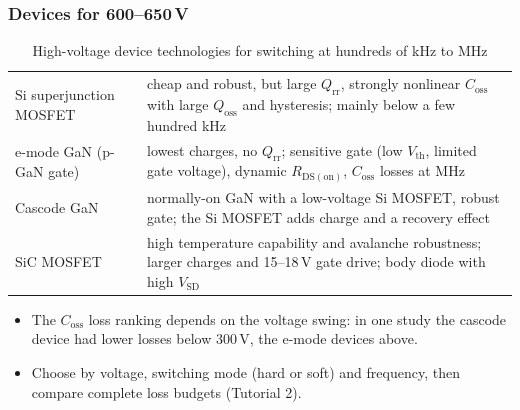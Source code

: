 \begin{frame}
	\frametitle{Devices for 600--650\,V}
	\begin{table}
		\centering
		\small
		\begin{tabular}{|l|>{\raggedright\arraybackslash}p{9.6cm}|}
			\hline
			Si superjunction MOSFET & cheap and robust, but large $Q_\mathrm{rr}$, strongly nonlinear $C_\mathrm{oss}$ with large $Q_\mathrm{oss}$ and hysteresis; mainly below a few hundred kHz \\
			e-mode GaN (p-GaN gate) & lowest charges, no $Q_\mathrm{rr}$; sensitive gate (low $V_\mathrm{th}$, limited gate voltage), dynamic $R_\mathrm{DS(on)}$, $C_\mathrm{oss}$ losses at MHz \\
			Cascode GaN             & normally-on GaN with a low-voltage Si MOSFET, robust gate; the Si MOSFET adds charge and a recovery effect \\
			SiC MOSFET              & high temperature capability and avalanche robustness; larger charges and 15--18\,V gate drive; body diode with high $V_\mathrm{SD}$ \\
			\hline
		\end{tabular}
		\caption{High-voltage device technologies for switching at hundreds of kHz to MHz}
	\end{table}
	\begin{itemize}
		\item The $C_\mathrm{oss}$ loss ranking depends on the voltage swing: in one study the cascode device had lower losses below 300\,V, the e-mode devices above.
		\item Choose by voltage, switching mode (hard or soft) and frequency, then compare complete loss budgets (Tutorial 2).
	\end{itemize}
\end{frame}

